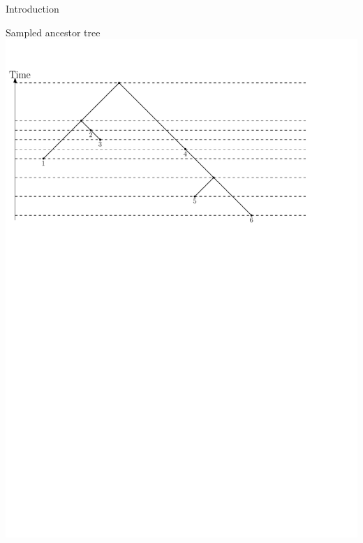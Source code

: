 \documentclass{beamer}
\theoremstyle{example}
\begin{document}
\begin{frame}{Introduction}
\begin{block}{Sampled ancestor tree}
\includegraphics[width=\framewidth]{SampledAncestorTree}
\end{block}
\end{frame}
\end{document}

